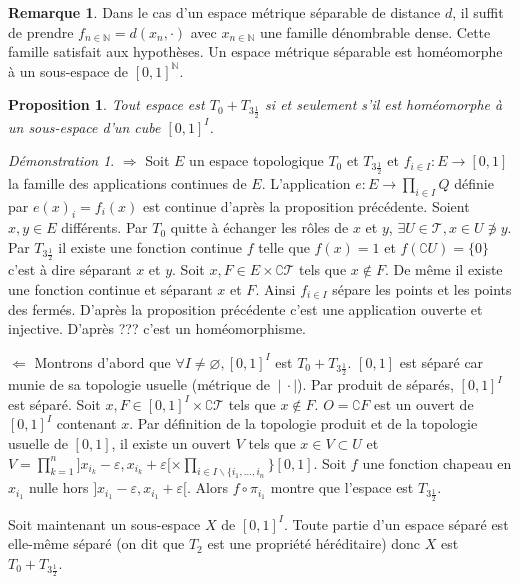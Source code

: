 \documentclass[a4paper, 11pt, french]{book}
\newenvironment{itemise}{\itemize}{\enditemize}
\theoremstyle{plain} %
\newtheorem{proposition}{Proposition}
\theoremstyle{definition} %
\newtheorem{remarque}{Remarque}
\theoremstyle{remark} %
\newtheorem*{demonstration}{Démonstration}
\renewcommand{\setminus}{\backslash}
\newcommand{\1}{\mathds{1}}
\newcommand\vide{\varnothing}
\newcommand{\N}{\mathbb{N}}
\newcommand\ens[2]{\{#1 \ |\ #2\}}
\begin{document}
\begin{remarque}
	Dans le cas d'un espace métrique séparable de distance $d$, il suffit de prendre $f_{n\in\N}=d(x_n, \cdot)$ avec $x_{n\in\N}$ une famille dénombrable dense.
	Cette famille satisfait aux hypothèses.
	Un espace métrique séparable est homéomorphe à un sous-espace de $[0, 1]^\N$.
\end{remarque}

\begin{proposition}
	Tout espace est $T_0+T_{3\frac{1}{2}}$ si et seulement s'il est homéomorphe à un sous-espace d'un cube $[0, 1]^I$.
\end{proposition}

\begin{demonstration}
	\begin{itemise}
		\item[$\Rightarrow$] Soit $E$ un espace topologique $T_0$ et $T_{3\frac{1}{2}}$ et $f_{i\in I}:E\rightarrow [0, 1]$ la famille des applications continues de $E$.
		L'application $e:E\rightarrow \prod_{i\in I}Q$ définie par $e(x)_i=f_i(x)$ est continue d'après la proposition précédente.
		Soient $x, y\in E$ différents.
		Par $T_0$ quitte à échanger les rôles de $x$ et $y$, $\exists U\in\mathscr{T}, x\in U\not\ni y$.
		Par $T_{3\frac{1}{2}}$ il existe une fonction continue $f$ telle que $f(x)=1$ et $f(\complement U)=\ens{0\}$ c'est à dire séparant $x$ et $y$.
		Soit $x, F\in E\times\complement\mathscr{T}$ tels que $x\notin F$.
		De même il existe une fonction continue et séparant $x$ et $F$.
		Ainsi $f_{i\in I}$ sépare les points et les points des fermés.
		D'après la proposition précédente c'est une application ouverte et injective.
		D'après {\color{red} ???} c'est un homéomorphisme.
		\item[$\Leftarrow$] Montrons d'abord que $\forall I\neq\vide, [0, 1]^I$ est $T_0+T_{3\frac{1}{2}}$.
		$[0, 1]$ est séparé car munie de sa topologie usuelle (métrique de $}{\cdot|$).
		Par produit de séparés, $[0, 1]^I$ est séparé.
		Soit $x, F\in[0, 1]^I\times\complement\mathscr{T}$ tels que $x\notin F$.
		$O=\complement F$ est un ouvert de $[0, 1]^I$ contenant $x$.
		Par définition de la topologie produit et de la topologie usuelle de $[0, 1]$, il existe un ouvert $V$ tels que $x\in V\subset U$ et $V=\prod_{k=1}^n]x_{i_k}-\varepsilon, x_{i_k}+\varepsilon[\times\prod_{i\in I\setminus\{i_1, ..., i_n}}[0, 1]$.
					Soit $f$ une fonction chapeau en $x_{i_1}$ nulle hors $]x_{i_1}-\varepsilon, x_{i_1}+\varepsilon[$.
		Alors $f\circ\pi_{i_1}$ montre que l'espace est $T_{3\frac{1}{2}}$.

		Soit maintenant un sous-espace $X$ de $[0, 1]^I$.
		Toute partie d'un espace séparé est elle-même séparé (on dit que $T_2$ est une propriété héréditaire) donc $X$ est $T_0+T_{3\frac{1}{2}}$.
	\end{itemise}
\end{demonstration}
\end{document}
